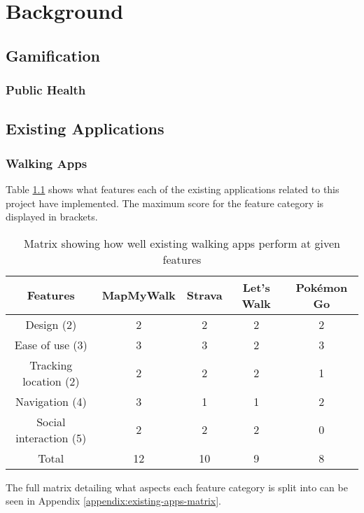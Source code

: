 \chapter{Background}

\section{Gamification}

\subsection{Public Health}

\section{Existing Applications}

\subsection{Walking Apps}


Table \ref{table:existing-walking-apps} shows what features each of the existing applications related to this project have implemented. The maximum score for the feature category is displayed in brackets.

\begin{table}[h]
  \centering
  \begin{tabular}{|c||c|c|c|c|}
    \hline
    Features & MapMyWalk & Strava & Let's Walk & Pok\'{e}mon Go\\
    \hline
    \hline
    Design (2) & 2 & 2 & 2 & 2\\
    \hline
    Ease of use (3) & 3 & 3 & 2 & 3\\
    \hline
    Tracking location (2) & 2 & 2 & 2 & 1\\
    \hline
    Navigation (4) & 3 & 1 & 1 & 2\\
    \hline
    Social interaction (5) & 2 & 2 & 2 & 0\\
    \hline
    \hline
    Total & 12 & 10 & 9 & 8\\
    \hline
  \end{tabular}
  \caption{Matrix showing how well existing walking apps perform at given features}
  \label{table:existing-walking-apps}
\end{table}

The full matrix detailing what aspects each feature category is split into can be seen in Appendix \ref{appendix:existing-apps-matrix}.


